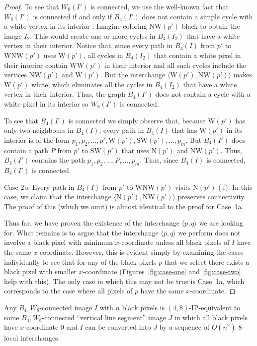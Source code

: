 \documentclass[lotsofwhite,charterfonts]{patmorin}
\newcommand{\N}{\mathrm{N}}
\renewcommand{\S}{\mathrm{S}}
\newcommand{\W}{\mathrm{W}}
\newcommand{\NW}{\mathrm{NW}}
\newcommand{\ic}[2]{\langle #1,#2 \rangle}
\begin{document}
\begin{proof}
To see that $W_8(I')$ is connected, we use the well-known fact that
$W_8(I')$ is connected if and only if $B_4(I')$ does not contain a
simple cycle with a white vertex in its interior \cite{r70}.  Imagine
coloring $\NW(p')$ black to obtain the image $I_2$.  This would create
one or more cycles in $B_4(I_2)$ that have a white vertex in their
interior.  Notice that, since every path in $B_4(I)$ from $p'$ to
$\W\N\W(p')$ uses $\W(p')$, all cycles in $B_4(I_2)$ that contain a
white pixel in their interior contain $\W\W(p')$ in their interior and
all such cycles include the vertices $\NW(p')$ and $\W(p')$.  But the
interchange $\ic{\W(p')}{\N\W(p')}$ makes $\W(p')$ white, which
eliminates all the cycles in $B_4(I_2)$ that have a white vertex in
their interior.  Thus, the graph $B_4(I')$ does not contain a cycle
with a white pixel in its interior so $W_8(I')$ is connected.

To see that $B_4(I')$ is connected we simply observe that, because
$\W(p')$ has only two neighbours in $B_4(I)$, every path in $B_4(I)$
that has $\W(p')$ in its interior is of the form
$p_1,p_2,\ldots,p',\W(p'),\S\W(p'),\ldots,p_m$. But $B_4(I')$ does
contain a path $P$ from $p'$ to $\S\W(p')$ that uses $\N(p')$ and
$\NW(p')$. Thus, $B_4(I')$ contains the path
$p_1,p_2,\ldots,P,\ldots,p_m$.  Thus, since $B_4(I)$ is connected,
$B_4(I')$ is connected. 

\noindent Case 2b: Every path in $B_4(I)$ from $p'$ to $\W\NW(p')$
visits $\N(p')$ (.f).  In this case, we claim that
the interchange $\ic{\N(p')}{\NW(p')}$ preserves connectivity.  The
proof of this (which we omit) is almost identical to the proof for
Case~1a.

Thus far, we have proven the existence of the interchange $\ic{p}{q}$
we are looking for.  What remains is to argue that the interchange
$\ic{p}{q}$ we perform does not involve a black pixel with minimum
$x$-coordinate unless all black pixels of $I$ have the same
$x$-coordinate.  However, this is evident simply by examining the
cases individually to see that for any of the black pixels $p$ that we
select there exists a black pixel with smaller $x$-coordinate
(Figures~\ref{fig:case-one} and \ref{fig:case-two} help with this).
The only case in which this may not be true is Case~1a, which
corresponds to the case where all pixels of $p$ have the same
$x$-coordinate.  \end{proof}

\begin{lem}
Any $B_4,W_8$-connected image $I$ with $n$ black pixels is
$(4,8)$-IP-equivalent to some $B_4,W_8$-connected ``vertical line
segment'' image $J$ in which all black pixels have $x$-coordinate $0$
and $I$ can be converted into $J$ by a sequence of $O(n^2)$
8-local interchanges.
\end{lem}
\end{document}
